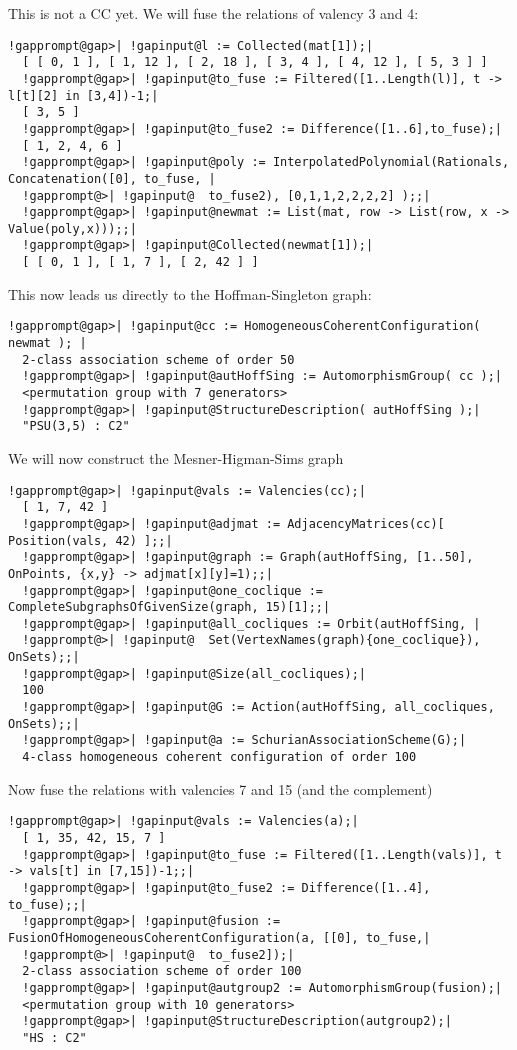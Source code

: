 \documentclass[a4paper,11pt]{report}
\begin{document}
{{ This is not a CC yet. We will fuse the relations of valency 3 and 4: 
\begin{Verbatim}[commandchars=!@|,fontsize=\small,frame=single,label=Example]
  !gapprompt@gap>| !gapinput@l := Collected(mat[1]);|
  [ [ 0, 1 ], [ 1, 12 ], [ 2, 18 ], [ 3, 4 ], [ 4, 12 ], [ 5, 3 ] ]
  !gapprompt@gap>| !gapinput@to_fuse := Filtered([1..Length(l)], t -> l[t][2] in [3,4])-1;|
  [ 3, 5 ]
  !gapprompt@gap>| !gapinput@to_fuse2 := Difference([1..6],to_fuse);|
  [ 1, 2, 4, 6 ]
  !gapprompt@gap>| !gapinput@poly := InterpolatedPolynomial(Rationals, Concatenation([0], to_fuse, |
  !gapprompt@>| !gapinput@	to_fuse2), [0,1,1,2,2,2,2] );;|
  !gapprompt@gap>| !gapinput@newmat := List(mat, row -> List(row, x -> Value(poly,x)));;|
  !gapprompt@gap>| !gapinput@Collected(newmat[1]);|
  [ [ 0, 1 ], [ 1, 7 ], [ 2, 42 ] ]
\end{Verbatim}
 This now leads us directly to the Hoffman-Singleton graph: 
\begin{Verbatim}[commandchars=!@|,fontsize=\small,frame=single,label=Example]
  !gapprompt@gap>| !gapinput@cc := HomogeneousCoherentConfiguration( newmat ); |
  2-class association scheme of order 50
  !gapprompt@gap>| !gapinput@autHoffSing := AutomorphismGroup( cc );|
  <permutation group with 7 generators>
  !gapprompt@gap>| !gapinput@StructureDescription( autHoffSing );|
  "PSU(3,5) : C2"
\end{Verbatim}
 We will now construct the Mesner-Higman-Sims graph 
\begin{Verbatim}[commandchars=!@|,fontsize=\small,frame=single,label=Example]
  !gapprompt@gap>| !gapinput@vals := Valencies(cc);|
  [ 1, 7, 42 ]
  !gapprompt@gap>| !gapinput@adjmat := AdjacencyMatrices(cc)[ Position(vals, 42) ];;|
  !gapprompt@gap>| !gapinput@graph := Graph(autHoffSing, [1..50], OnPoints, {x,y} -> adjmat[x][y]=1);;|
  !gapprompt@gap>| !gapinput@one_coclique := CompleteSubgraphsOfGivenSize(graph, 15)[1];;|
  !gapprompt@gap>| !gapinput@all_cocliques := Orbit(autHoffSing, |
  !gapprompt@>| !gapinput@	Set(VertexNames(graph){one_coclique}), OnSets);;|
  !gapprompt@gap>| !gapinput@Size(all_cocliques);|
  100
  !gapprompt@gap>| !gapinput@G := Action(autHoffSing, all_cocliques, OnSets);;|
  !gapprompt@gap>| !gapinput@a := SchurianAssociationScheme(G);|
  4-class homogeneous coherent configuration of order 100
\end{Verbatim}
 Now fuse the relations with valencies 7 and 15 (and the complement) 
\begin{Verbatim}[commandchars=!@|,fontsize=\small,frame=single,label=Example]
  !gapprompt@gap>| !gapinput@vals := Valencies(a);|
  [ 1, 35, 42, 15, 7 ]
  !gapprompt@gap>| !gapinput@to_fuse := Filtered([1..Length(vals)], t -> vals[t] in [7,15])-1;;|
  !gapprompt@gap>| !gapinput@to_fuse2 := Difference([1..4], to_fuse);;|
  !gapprompt@gap>| !gapinput@fusion := FusionOfHomogeneousCoherentConfiguration(a, [[0], to_fuse,|
  !gapprompt@>| !gapinput@	to_fuse2]);|
  2-class association scheme of order 100
  !gapprompt@gap>| !gapinput@autgroup2 := AutomorphismGroup(fusion);|
  <permutation group with 10 generators>
  !gapprompt@gap>| !gapinput@StructureDescription(autgroup2);|
  "HS : C2"
\end{Verbatim}
 }

 }
\end{document}
